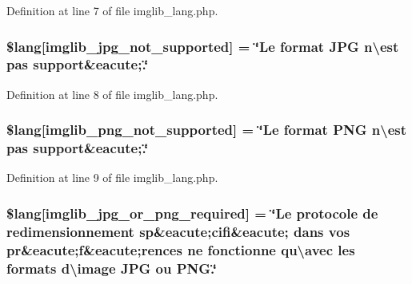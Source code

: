 Definition at line 7 of file imglib\+\_\+lang.\+php.

\subsubsection[{\texorpdfstring{\$lang}{$lang}}]{\setlength{\rightskip}{0pt plus 5cm}\$lang\mbox{[}\textquotesingle{}imglib\+\_\+jpg\+\_\+not\+\_\+supported\textquotesingle{}\mbox{]} = \char`\"{}Le format J\+PG n\textbackslash{}\textquotesingle{}est pas support\&eacute;.\char`\"{}}\hypertarget{application_2language_2french_2imglib__lang_8php_a4acdc927c172bab1370b2897c667c552}{}\label{application_2language_2french_2imglib__lang_8php_a4acdc927c172bab1370b2897c667c552}


Definition at line 8 of file imglib\+\_\+lang.\+php.

\subsubsection[{\texorpdfstring{\$lang}{$lang}}]{\setlength{\rightskip}{0pt plus 5cm}\$lang\mbox{[}\textquotesingle{}imglib\+\_\+png\+\_\+not\+\_\+supported\textquotesingle{}\mbox{]} = \char`\"{}Le format P\+NG n\textbackslash{}\textquotesingle{}est pas support\&eacute;.\char`\"{}}\hypertarget{application_2language_2french_2imglib__lang_8php_a0b7ea2e2fbd03eb72fe9d969adb643dd}{}\label{application_2language_2french_2imglib__lang_8php_a0b7ea2e2fbd03eb72fe9d969adb643dd}


Definition at line 9 of file imglib\+\_\+lang.\+php.

\subsubsection[{\texorpdfstring{\$lang}{$lang}}]{\setlength{\rightskip}{0pt plus 5cm}\$lang\mbox{[}\textquotesingle{}imglib\+\_\+jpg\+\_\+or\+\_\+png\+\_\+required\textquotesingle{}\mbox{]} = \char`\"{}Le protocole de redimensionnement sp\&eacute;cifi\&eacute; dans vos pr\&eacute;{\bf f}\&eacute;rences ne fonctionne qu\textbackslash{}\textquotesingle{}avec les formats d\textbackslash{}\textquotesingle{}image J\+PG ou P\+N\+G.\char`\"{}}\hypertarget{application_2language_2french_2imglib__lang_8php_a2878e2b878871cd8010970f865d70e71}{}\label{application_2language_2french_2imglib__lang_8php_a2878e2b878871cd8010970f865d70e71}



